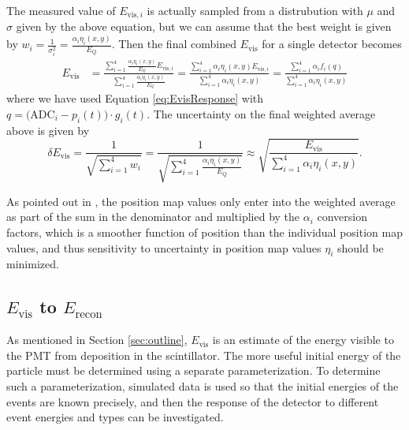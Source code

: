 The measured value of $E_{\mathrm{vis},i}$ is actually sampled from a distrubution with $\mu$ and $\sigma$ given by the
above equation, but we can assume that the best weight is given by $w_i = \frac{1}{\sigma_i^2} = \frac{\alpha_i \eta_i(x,y)}{E_Q}$.
Then the final combined $E_{\mathrm{vis}}$ for a single detector becomes
%
\begin{align}
  E_{\mathrm{vis}} &= \frac{\sum_{i=1}^{4} \frac{\alpha_i \eta_i(x,y)}{E_Q} E_{\mathrm{vis},i}}{\sum_{i=1}^{4} \frac{\alpha_i \eta_i(x,y)}{E_Q}}
  = \frac{\sum_{i=1}^{4} \alpha_i \eta_i(x,y) E_{\mathrm{vis},i}}{\sum_{i=1}^{4} \alpha_i \eta_i(x,y)} 
  = \frac{\sum_{i=1}^{4} \alpha_i f_i(q)}{\sum_{i=1}^{4} \alpha_i \eta_i(x,y)}
\end{align}
%
where we have used Equation \ref{eq:EvisResponse} with $q=\big( \mathrm{ADC}_i - p_i(t) \big) \cdot g_i(t)$.
The uncertainty on the final weighted average above is given by
\begin{equation}
  \delta E_{\mathrm{vis}} = \frac{1}{\sqrt{\sum_{i=1}^{4} w_i}} = \frac{1}{\sqrt{\sum_{i=1}^{4} \frac{\alpha_i \eta_i(x,y)}{E_Q}}}
    \approx  \sqrt{\frac{E_{\mathrm{vis}}}{\sum_{i=1}^{4}\alpha_i \eta_i(x,y)}}.
\end{equation}

As pointed out in \cite{mpmThesis}, the position map values only enter into the weighted average
as part of the sum in the denominator and multiplied by the $\alpha_i$ conversion factors, which is a smoother
function of position than the individual position map values, and thus sensitivity to uncertainty in position map
values $\eta_i$ should be minimized.

\subsection{$E_{\mathrm{vis}}$ to $E_{\mathrm{recon}}$}

As mentioned in Section \ref{sec:outline}, $E_{\mathrm{vis}}$ is an estimate of the
energy visible to the PMT from deposition in the scintillator. The more useful
initial energy of the particle must be determined using a separate parameterization.
To determine such a parameterization, simulated data is used so that the initial
energies of the events are known precisely, and then the response of the detector
to different event energies and types can be investigated.

